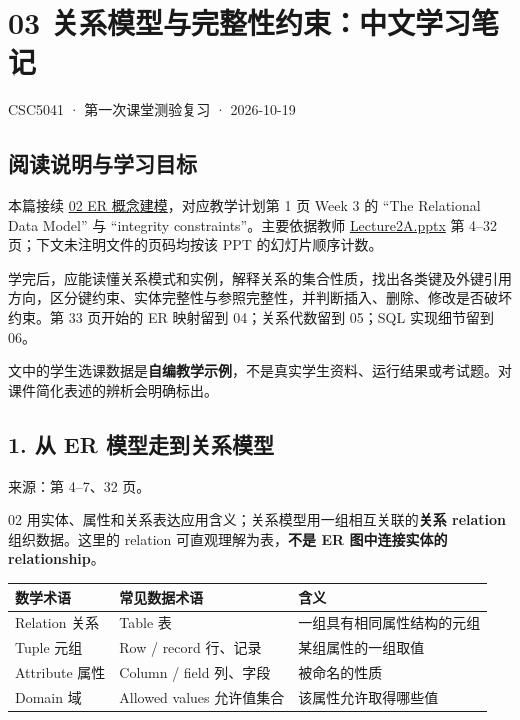 \clearpage
\section{03 关系模型与完整性约束：中文学习笔记}\label{03_relational_model_and_integrity_zh}

CSC5041 · 第一次课堂测验复习 · 2026-10-19

\subsection{阅读说明与学习目标}\label{03_relational_model_and_integrity_zh-ux9605ux8bfbux8bf4ux660eux4e0eux5b66ux4e60ux76eeux6807}

本篇接续 \hyperref[02_er_modelling_zh]{02 ER 概念建模}，对应教学计划第 1 页 Week 3 的 ``The Relational Data Model'' 与 ``integrity constraints''。主要依据教师 \href{../../../slides/Lecture2A.pptx}{Lecture2A.pptx} 第 4--32 页；下文未注明文件的页码均按该 PPT 的幻灯片顺序计数。

学完后，应能读懂关系模式和实例，解释关系的集合性质，找出各类键及外键引用方向，区分键约束、实体完整性与参照完整性，并判断插入、删除、修改是否破坏约束。第 33 页开始的 ER 映射留到 04；关系代数留到 05；SQL 实现细节留到 06。

文中的学生选课数据是\textbf{自编教学示例}，不是真实学生资料、运行结果或考试题。对课件简化表述的辨析会明确标出。

\subsection{1. 从 ER 模型走到关系模型}\label{03_relational_model_and_integrity_zh-ux4ece-er-ux6a21ux578bux8d70ux5230ux5173ux7cfbux6a21ux578b}

来源：第 4--7、32 页。

02 用实体、属性和关系表达应用含义；关系模型用一组相互关联的\textbf{关系 relation} 组织数据。这里的 relation 可直观理解为表，\textbf{不是 ER 图中连接实体的 relationship}。

\begin{longtable}[]{@{}lll@{}}
\toprule\noalign{}
数学术语 & 常见数据术语 & 含义 \\
\midrule\noalign{}
\endhead
\bottomrule\noalign{}
\endlastfoot
Relation 关系 & Table 表 & 一组具有相同属性结构的元组 \\
Tuple 元组 & Row / record 行、记录 & 某组属性的一组取值 \\
Attribute 属性 & Column / field 列、字段 & 被命名的性质 \\
Domain 域 & Allowed values 允许值集合 & 该属性允许取得哪些值 \\
\end{longtable}

